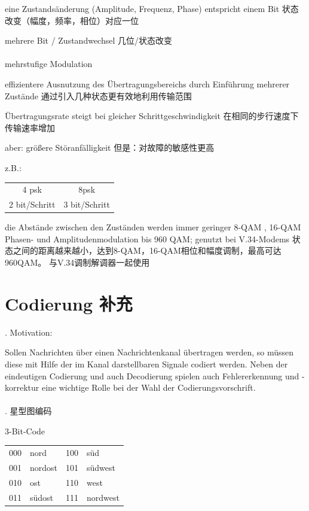 \documentclass[fleqn]{article}
\begin{document}
eine Zustandsänderung (Amplitude, Frequenz, Phase) entspricht einem Bit
状态改变（幅度，频率，相位）对应一位

mehrere Bit / Zustandwechsel
几位/状态改变
\\
\\
 mehrstufige Modulation

effizientere Ausnutzung des Übertragungsbereichs durch Einführung mehrerer Zustände
通过引入几种状态更有效地利用传输范围

Übertragungsrate steigt bei gleicher Schrittgeschwindigkeit
在相同的步行速度下传输速率增加

aber: größere Störanfälligkeit
但是：对故障的敏感性更高

z.B.:

\begin{center}
    \begin{tabular}{c|c}
        4 psk&8psk\\
        2 bit/Schritt&3 bit/Schritt
    \end{tabular}
\end{center}

die Abstände zwischen den Zuständen werden immer geringer
8-QAM , 16-QAM Phasen- und Amplitudenmodulation bis 960 QAM; genutzt bei V.34-Modems
状态之间的距离越来越小，达到8-QAM，16-QAM相位和幅度调制，最高可达960QAM。 与V.34调制解调器一起使用

\section{Codierung 补充}

. Motivation:

Sollen Nachrichten über einen Nachrichtenkanal übertragen werden, so müssen diese mit Hilfe der im Kanal darstellbaren Signale codiert werden. Neben der eindeutigen Codierung und auch Decodierung spielen auch Fehlererkennung und -korrektur eine wichtige Rolle bei der Wahl der Codierungsvorschrift.
\\
\\
. 星型图编码

\begin{center}
    3-Bit-Code

    \begin{tabular}{l|l|l|l}
    \hline
    000&nord&100&süd\\
    001&nordost&101&südwest\\
    010&ost&110&west\\
    011&südost&111&nordwest\\
    \hline    
    \end{tabular}
\end{center}
\end{document}
